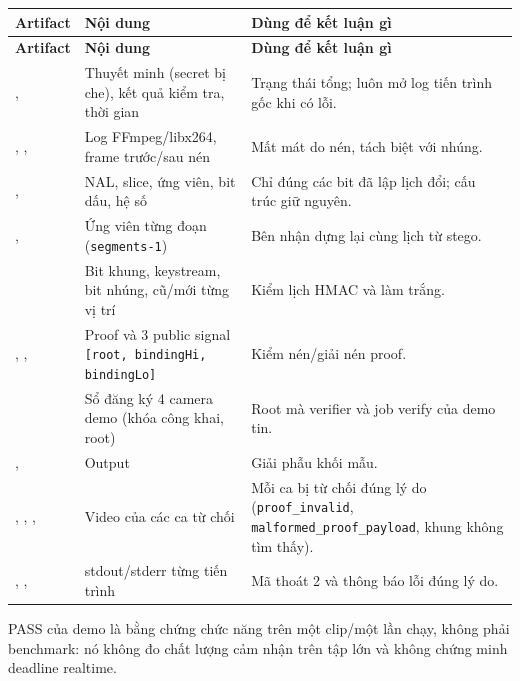 \documentclass[11pt,a4paper]{article}
\begin{document}
\begin{longtable}{P{.3\textwidth}P{.3\textwidth}P{.31\textwidth}}
\toprule\textbf{Artifact} & \textbf{Nội dung} & \textbf{Dùng để kết luận gì} \\
\midrule\endfirsthead
\toprule\textbf{Artifact} & \textbf{Nội dung} & \textbf{Dùng để kết luận gì} \\
\midrule\endhead
{},  & Thuyết minh (secret bị che), kết quả kiểm tra, thời gian & Trạng thái tổng; luôn mở log tiến trình gốc khi có lỗi. \\
, ,  & Log FFmpeg/libx264, frame trước/sau nén & Mất mát do nén, tách biệt với nhúng. \\
,  & NAL, slice, ứng viên, bit dấu, hệ số & Chỉ đúng các bit đã lập lịch đổi; cấu trúc giữ nguyên. \\
,  & Ứng viên từng đoạn (\texttt{segments-1}) & Bên nhận dựng lại cùng lịch từ stego. \\
 & Bit khung, keystream, bit nhúng, cũ/mới từng vị trí & Kiểm lịch HMAC và làm trắng. \\
, ,  & Proof và 3 public signal \texttt{[root, bindingHi, bindingLo]} & Kiểm nén/giải nén proof. \\
 & Sổ đăng ký 4 camera demo (khóa công khai, root) & Root mà verifier và job verify của demo tin. \\
,  & Output  & Giải phẫu khối mẫu. \\
, , ,  & Video của các ca từ chối & Mỗi ca bị từ chối đúng lý do (\texttt{proof\_invalid}, \texttt{malformed\_proof\_payload}, khung không tìm thấy). \\
, ,  & stdout/stderr từng tiến trình & Mã thoát 2 và thông báo lỗi đúng lý do. \\
\bottomrule\end{longtable}

PASS của demo là bằng chứng chức năng trên một clip/một lần chạy, không phải benchmark:
nó không đo chất lượng cảm nhận trên tập lớn và không chứng minh deadline realtime.
\end{document}
